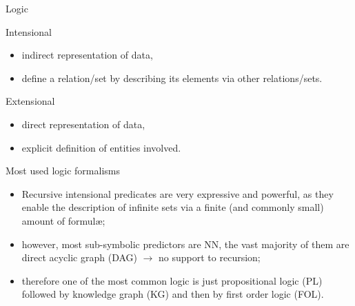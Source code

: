 \documentclass[presentation]{beamer}\mode<presentation>{\usetheme{AMSBolognaFC}}
\begin{document}
\begin{frame}[allowframebreaks]{Logic}
    \begin{block}{Intensional}
        \begin{itemize}
            \item indirect representation of data,
            \item define a relation/set by describing its elements via other relations/sets.
        \end{itemize}
    \end{block}
    \begin{block}{Extensional}
        \begin{itemize}
            \item direct representation of data,
            \item explicit definition of entities involved.
        \end{itemize}
    \end{block}
    
    \framebreak
    
    \begin{block}{Most used logic formalisms}
        \begin{itemize}
            \item Recursive intensional predicates are very expressive and powerful, as they enable the description of infinite sets via a finite (and commonly small) amount of formul\ae;
            \item however, most sub-symbolic predictors are NN, the vast majority of them are direct acyclic graph (DAG) $\rightarrow$ no support to recursion;
            \item therefore one of the most common logic is just \alert{propositional logic (PL)} followed by \alert{knowledge graph (KG)} and then by \alert{first order logic (FOL)}.
        \end{itemize}
    \end{block}
\end{frame}



\section{\longpsyki}
\end{document}
